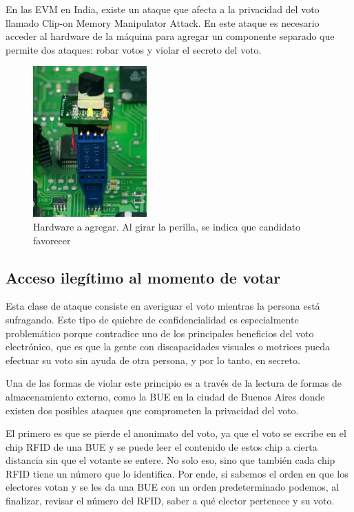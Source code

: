 En las EVM en India, existe un ataque que afecta a la privacidad del voto llamado Clip-on Memory Manipulator Attack\cite{india}. En este ataque es necesario acceder al hardware de la máquina para agregar un componente separado que permite dos ataques: robar votos y violar el secreto del voto.
\begin{figure}[H]
	\centering
	\includegraphics{Imagenes/privacidad2}
	\caption{Hardware a agregar. Al girar la perilla, se indica que candidato favorecer}
\end{figure}


\subsection{Acceso ilegítimo al momento de votar}

Esta clase de ataque consiste en averiguar el voto mientras la persona está sufragando. Este tipo de quiebre de confidencialidad es especialmente problemático porque contradice uno de los principales beneficios del voto electrónico, que es que la gente con discapacidades visuales o motrices pueda efectuar su voto sin ayuda de otra persona, y por lo tanto, en secreto.

Una de las formas de violar este principio es a través de la lectura de formas de almacenamiento externo, como la BUE en la ciudad de Buenos Aires donde existen dos posibles ataques que comprometen la privacidad del voto\cite{votar}.

El primero es que se pierde el anonimato del voto, ya que el voto se escribe en el chip RFID de una BUE y se puede leer el contenido de estos chip a cierta distancia sin que el votante se entere. No solo eso, sino que también cada chip RFID tiene un número que lo identifica. Por ende, si sabemos el orden en que los electores votan y se les da una BUE con un orden predeterminado podemos, al finalizar, revisar el número del RFID, saber a qué elector pertenece y su voto\cite{smaldone:chip}.

